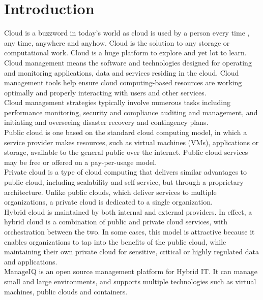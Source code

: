 \documentclass[a4paper,12pt]{report}
\begin{document}
\tableofcontents{}

\chapter{Introduction}
Cloud is a buzzword in today's world as cloud is used by a person every time , any time, anywhere and anyhow. Cloud is the solution to any storage or computational work. Cloud is a huge platform to explore and yet lot to learn. Cloud management means the software and technologies designed for operating and monitoring applications, data and services residing in the cloud. Cloud management tools help ensure cloud computing-based resources are working optimally and properly interacting with users and other services.\\

Cloud management strategies typically involve numerous tasks including performance monitoring, security and compliance auditing and management, and initiating and overseeing disaster recovery and contingency plans.\\

Public cloud is one based on the standard cloud computing model, in which a service provider makes resources, such as virtual machines (VMs), applications or storage, available to the general public over the internet. Public cloud services may be free or offered on a pay-per-usage model.\\

Private cloud is a type of cloud computing that delivers similar advantages to public cloud, including scalability and self-service, but through a proprietary architecture. Unlike public clouds, which deliver services to multiple organizations, a private cloud is dedicated to a single organization.\\

Hybrid cloud is maintained by both internal and external providers. In effect, a hybrid cloud is a combination of public and private cloud services, with orchestration between the two. In some cases, this model is attractive because it enables organizations to tap into the benefits of the public cloud, while maintaining their own private cloud for sensitive, critical or highly regulated data and applications.\\

ManageIQ is an open source management platform for Hybrid IT. It can manage small and large environments, and supports multiple technologies such as virtual machines, public clouds and containers.
\end{document}
